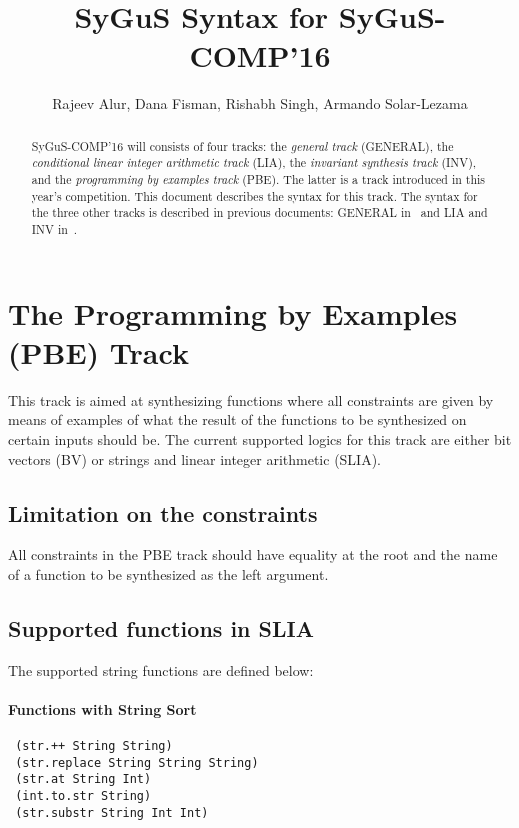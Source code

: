 \documentclass{llncs}
\title{SyGuS Syntax for SyGuS-COMP'16}
\author{Rajeev Alur, Dana Fisman, Rishabh Singh, Armando Solar-Lezama}
\institute{}
\begin{document}
\maketitle

\newcommand{\la}{\langle}
\newcommand{\ra}{\rangle}
\newcommand{\commentout}[1]{}

\begin{abstract}
SyGuS-COMP'16 will consists of four tracks: the \emph{general track} (GENERAL), the \emph{conditional linear integer arithmetic track} (LIA), the \emph{invariant synthesis track} (INV), and the \emph{programming by examples track} (PBE). The latter is a track introduced in this year's competition. This document describes the syntax for this track. The syntax for the three other tracks is described in previous documents: GENERAL in~\cite{sygus-if} and LIA and INV in~\cite{sygus15syntax}. 
\end{abstract}


\section{The Programming by Examples (PBE) Track}
This track is aimed at synthesizing functions where all constraints are given by means of examples of what the result of the functions to be synthesized on certain inputs should be. The current supported logics for this track are either bit vectors (BV) or strings and linear integer arithmetic (SLIA).


\subsection*{Limitation on the constraints}
All constraints in the PBE track should have equality at the root and the name of a function to be synthesized as the left argument.


\subsection*{Supported functions in SLIA}
The supported string functions are defined below:

\paragraph{Functions with String Sort}
\begin{verbatim}
 (str.++ String String)
 (str.replace String String String)
 (str.at String Int)
 (int.to.str String)
 (str.substr String Int Int)
\end{verbatim}
\end{document}
